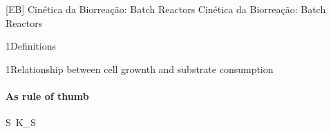 \documentclass[\mainfilename]{subfiles}
\begin{document}

[EB]
{Cinética da Biorreação: Batch Reactors} %
{Cinética da Biorreação: Batch Reactors} %

\begin{sectionBox}1{Definitions} %
    
    
    
\end{sectionBox}

\setcounter{section}{5}
\begin{sectionBox}1{Relationship between cell grownth and substrate consumption} %
    
    \paragraph*{As rule of thumb}
    \begin{BM}
        S \,K_S
    \end{BM}
    
\end{sectionBox}
\end{document}
